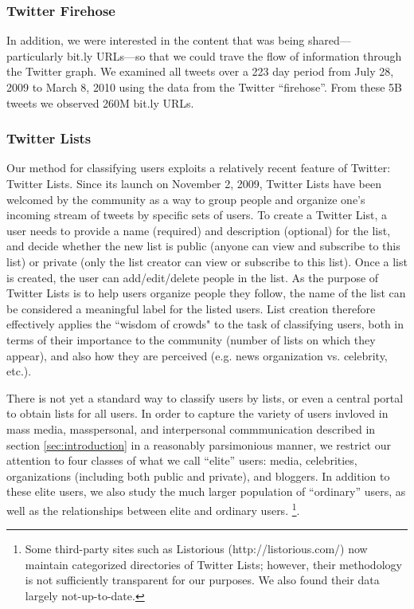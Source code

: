 \documentclass[phd,tocprelim]{cornell}
\begin{document}
\subsubsection{Twitter Firehose}
\label{sec:firehose}
In addition, we were interested in the content that was being
shared---particularly bit.ly URLs---so that we could trave the flow of
information through the Twitter graph.  We examined all tweets over a 223
day period from July 28, 2009 to March 8, 2010 using the data from the
Twitter ``firehose''.  From these 5B tweets we observed 260M bit.ly URLs.

\subsubsection{Twitter Lists}
\label{sec:classify}
Our method for classifying users exploits a relatively recent feature of
Twitter: Twitter Lists. Since its launch on November 2, 2009, Twitter Lists
have been welcomed by the community as a way to group people and organize
one's incoming stream of tweets by specific sets of users. To create a
Twitter List, a user needs to provide a name (required) and description
(optional) for the list, and decide whether the new list is public (anyone
can view and subscribe to this list) or private (only the list creator can
view or subscribe to this list). Once a list is created, the user can
add/edit/delete people in the list. As the purpose of Twitter Lists is to
help users organize people they follow, the name of the list can be
considered a meaningful label for the listed users.  List creation
therefore effectively applies the ``wisdom of crowds" to the task of
classifying users, both in terms of their importance to the community
(number of lists on which they appear), and also how they are perceived
(e.g. news organization vs. celebrity, etc.).


There is not yet a standard way to classify users by lists, or even a
central portal to obtain lists for all users. In order to capture the
variety of users invloved in mass media, masspersonal, and interpersonal
commmunication described in section \ref{sec:introduction} in a reasonably
parsimonious manner, we restrict our attention to four classes of what we
call ``elite'' users: media, celebrities, organizations (including both
public and private), and bloggers. In addition to these elite users, we
also study the much larger population of ``ordinary'' users, as well as the
relationships between elite and ordinary users.
 \footnote{Some
 third-party sites such as Listorious (http://listorious.com/) now
 maintain categorized directories of Twitter Lists; however, their
 methodology is not sufficiently transparent for our
 purposes. We also found their data largely not-up-to-date.}. 
\end{document}
